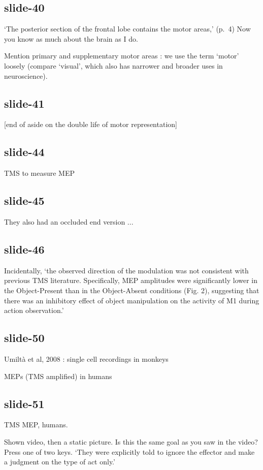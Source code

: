 \documentclass[12pt,\papersize]{extarticle}
\begin{document}
\subsection{slide-40}
‘The posterior section of the frontal lobe contains the motor areas,’ (p.~4)
Now you know as much about the brain as I do.
 
Mention primary and supplementary motor areas : we use the term ‘motor’ loosely
(compare ‘visual’, which also has narrower and broader uses in
neuroscience).
 
\subsection{slide-41}
[end of aside on the double life of motor representation]
 
 
\subsection{slide-44}
TMS to measure MEP
 
\subsection{slide-45}
They also had an occluded end version ...
 
\subsection{slide-46}
Incidentally, ‘the observed direction of the modulation was not consistent with previous TMS
literature. Specifically, MEP amplitudes were significantly lower in the Object-Present than in the
Object-Absent conditions (Fig. 2), suggesting that there was an inhibitory effect of object
manipulation on the activity of M1 during action observation.’
 
\subsection{slide-50}
Umiltà et al, 2008 : single cell recordings in monkeys
 
MEPs (TMS amplified) in humans
 
\subsection{slide-51}
TMS MEP, humans.
 
Shown video, then a static picture.
Is this the same goal as you saw in the video?
Press one of two keys.
‘They were explicitly told to ignore the effector and make a judgment on the type of act only.’
 
\end{document}
